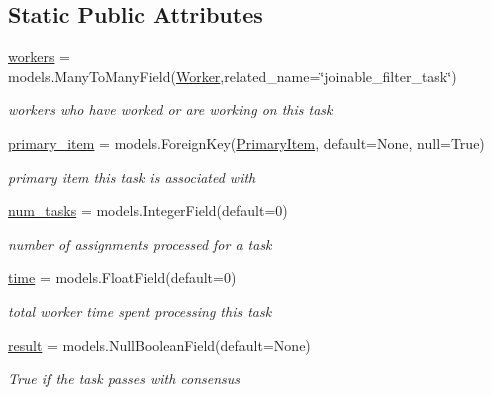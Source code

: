 \subsection*{Static Public Attributes}
\begin{DoxyCompactItemize}
\item 
\mbox{\hyperlink{classjoinapp_1_1models_1_1task__management__models_1_1_j_f_task_a42a0cd7f4a34b940f08fd182458c9aba}{workers}} = models.\+Many\+To\+Many\+Field(\mbox{\hyperlink{classjoinapp_1_1models_1_1task__management__models_1_1_worker}{Worker}},related\+\_\+name=\char`\"{}joinable\+\_\+filter\+\_\+task\char`\"{})
\begin{DoxyCompactList}\small\item\em workers who have worked or are working on this task \end{DoxyCompactList}\item 
\mbox{\hyperlink{classjoinapp_1_1models_1_1task__management__models_1_1_j_f_task_aba1ada8f72cc448a543f1b01551172fa}{primary\+\_\+item}} = models.\+Foreign\+Key(\textquotesingle{}\mbox{\hyperlink{classjoinapp_1_1models_1_1items_1_1_primary_item}{Primary\+Item}}\textquotesingle{}, default=None, null=True)
\begin{DoxyCompactList}\small\item\em primary item this task is associated with \end{DoxyCompactList}\item 
\mbox{\hyperlink{classjoinapp_1_1models_1_1task__management__models_1_1_j_f_task_afc259a6f918180e978f96108b03d3411}{num\+\_\+tasks}} = models.\+Integer\+Field(default=0)
\begin{DoxyCompactList}\small\item\em number of assignments processed for a task \end{DoxyCompactList}\item 
\mbox{\hyperlink{classjoinapp_1_1models_1_1task__management__models_1_1_j_f_task_a70c092a6aebace0b1ea406e14da78a40}{time}} = models.\+Float\+Field(default=0)
\begin{DoxyCompactList}\small\item\em total worker time spent processing this task \end{DoxyCompactList}\item 
\mbox{\hyperlink{classjoinapp_1_1models_1_1task__management__models_1_1_j_f_task_a937d4dd628a8858b443a399410d2600b}{result}} = models.\+Null\+Boolean\+Field(default=None)
\begin{DoxyCompactList}\small\item\em True if the task passes with consensus ~\newline

\end{DoxyCompactList}
\end{DoxyCompactItemize}
